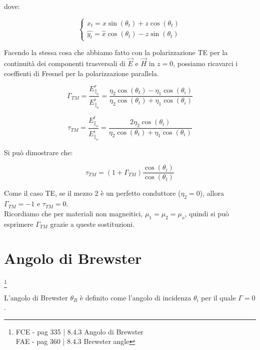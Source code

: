 dove: 

{\Large \begin{equation}
    \begin{cases}
        x_t = x \sin(\theta_t) + z \cos(\theta_t) \\ 
        \hat{y_t} = \hat{x} \cos(\theta_t) - \hat{z} \sin(\theta_t)        
    \end{cases}
\end{equation}}

Facendo la stessa cosa che abbiamo fatto con la polarizzazione TE per la continuità dei 
componenti trasversali di $\vec{E}$ e $\vec{H}$ in $z=0$, possiamo ricavarci i coeffienti di Fresnel per la polarizzazione parallela. 

{\Large \begin{equation}
    \Gamma_{TM} = \frac{E_{\parallel_o}^{r}}{E_{\parallel_o}^{i}} = \frac{\eta_2 \cos(\theta_t) - \eta_1 \cos(\theta_i)}{\eta_2 \cos(\theta_t) + \eta_1 \cos(\theta_i)}
\end{equation}}

{\Large \begin{equation}
    \tau_{TM} = \frac{E_{\parallel_o}^{t}}{E_{\parallel_o}^{i}} = \frac{2 \eta_2 \cos(\theta_i) }{\eta_2 \cos(\theta_t) + \eta_1 \cos(\theta_i)}
\end{equation}} 

Si può dimostrare che: 

{\Large \begin{equation}
    \tau_{TM} = (1 + \Gamma_{TM}) \frac{\cos(\theta_i)}{\cos(\theta_t)} 
\end{equation}} 


Come il caso TE, se il mezzo 2 è un perfetto conduttore ($\eta_2 = 0$), allora $\Gamma_{TM} = -1$ e $\tau_{TM} = 0$. \\ 

Ricordiamo che per materiali non magneitici, $\mu_1 = \mu_2 = \mu_o$, quindi si può esprimere $\Gamma_{TM}$ grazie 
a queste sostituzioni. 


\newpage 

\section{Angolo di Brewster} 

\footnote{FCE - pag 335 | 8.4.3 Angolo di Brewster \\ 
FAE - pag 360 | 8.4.3 Brewster angle } 

L'angolo di Brewster $\theta_B$ è definito come l'angolo di incidenza $\theta_i$ per il quale $\Gamma = 0$. \\ 

